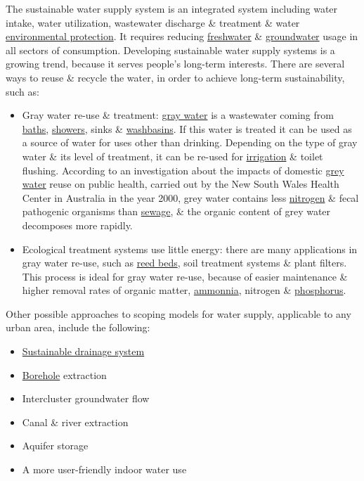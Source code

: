 \documentclass[oneside]{book}
\numberwithin{equation}{section}
\begin{document}
The sustainable water supply system is an integrated system including water intake, water utilization, wastewater discharge \& treatment \& water \href{https://en.wikipedia.org/wiki/Environmental_protection}{environmental protection}. It requires reducing \href{https://en.wikipedia.org/wiki/Freshwater}{freshwater} \& \href{https://en.wikipedia.org/wiki/Groundwater}{groundwater} usage in all sectors of consumption. Developing sustainable water supply systems is a growing trend, because it serves people's long-term interests. There are several ways to reuse \& recycle the water, in order to achieve long-term sustainability, such as:
\begin{itemize}
	\item Gray water re-use \& treatment: \href{https://en.wikipedia.org/wiki/Gray_water}{gray water} is a wastewater coming from \href{https://en.wikipedia.org/wiki/Bathing}{baths}, \href{https://en.wikipedia.org/wiki/Shower}{showers}, sinks \& \href{https://en.wikipedia.org/wiki/Washbasin}{washbasins}. If this water is treated it can be used as a source of water for uses other than drinking. Depending on the type of gray water \& its level of treatment, it can be re-used for \href{https://en.wikipedia.org/wiki/Irrigation}{irrigation} \& toilet flushing. According to an investigation about the impacts of domestic \href{https://en.wikipedia.org/wiki/Greywater}{grey water} reuse on public health, carried out by the New South Wales Health Center in Australia in the year 2000, grey water contains less \href{https://en.wikipedia.org/wiki/Nitrogen}{nitrogen} \& fecal pathogenic organisms than \href{https://en.wikipedia.org/wiki/Sewage}{sewage}, \& the organic content of grey water decomposes more rapidly.
	\item Ecological treatment systems use little energy: there are many applications in gray water re-use, such as \href{https://en.wikipedia.org/wiki/Reed_bed}{reed beds}, soil treatment systems \& plant filters. This process is ideal for gray water re-use, because of easier maintenance \& higher removal rates of organic matter, \href{https://en.wikipedia.org/wiki/Ammonia}{ammonnia}, nitrogen \& \href{https://en.wikipedia.org/wiki/Phosphorus}{phosphorus}.
\end{itemize}
Other possible approaches to scoping models for water supply, applicable to any urban area, include the following:
\begin{itemize}
	\item \href{https://en.wikipedia.org/wiki/Sustainable_drainage_system}{Sustainable drainage system}
	\item \href{https://en.wikipedia.org/wiki/Borehole}{Borehole} extraction
	\item Intercluster groundwater flow
	\item Canal \& river extraction
	\item Aquifer storage
	\item A more user-friendly indoor water use
\end{itemize}
\end{document}
